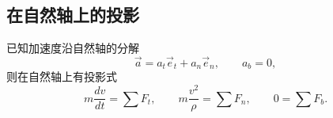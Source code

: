 \subsection{在自然轴上的投影}

已知加速度沿自然轴的分解
\begin{equation}\label{eq:10-accel-natural}
  \vec{a}=a_t\vec{e}_t+a_n\vec{e}_n,\qquad a_b=0,
\end{equation}
则在自然轴上有投影式
\begin{equation}\label{eq:10-projection-natural}
  m\frac{dv}{dt}=\sum F_t,\qquad
  m\frac{v^2}{\rho}=\sum F_n,\qquad
  0=\sum F_b.
\end{equation}
